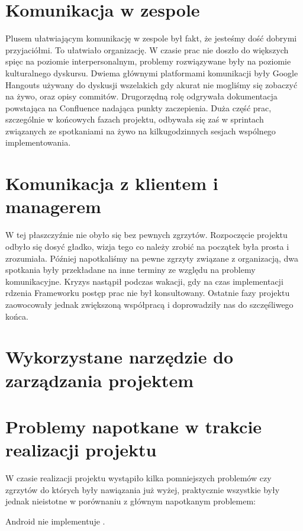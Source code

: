 \section{Komunikacja w zespole}
Plusem ułatwiającym komunikację w zespole był fakt, że jesteśmy dość dobrymi przyjaciółmi. To ułatwiało organizację. W czasie prac nie doszło do większych spięc na poziomie interpersonalnym, problemy rozwiązywane były na poziomie kulturalnego dyskursu. Dwiema głównymi platformami komunikacji były Google Hangouts używany do dyskusji wszelakich gdy akurat nie mogliśmy się zobaczyć na żywo, oraz opisy commitów. Drugorzędną rolę odgrywała dokumentacja powstająca na Confluence nadająca punkty zaczepienia. Duża część prac, szczególnie w końcowych fazach projektu, odbywała się zaś w sprintach związanych ze spotkaniami na żywo na kilkugodzinnych sesjach wspólnego implementowania.

\section{Komunikacja z klientem i managerem}
W tej płaszczyźnie nie obyło się bez pewnych zgrzytów. Rozpoczęcie projektu odbyło się dosyć gładko, wizja tego co należy zrobić na początek była prosta i zrozumiała. Później napotkaliśmy na pewne zgrzyty związane z organizacją, dwa spotkania były przekładane na inne terminy ze względu na problemy komunikacyjne. Kryzys nastąpił podczas wakacji, gdy na czas implementacji rdzenia Frameworku postęp prac nie był konsultowany. Ostatnie fazy projektu zaowocowały jednak zwiększoną współpracą i doprowadziły nas do szczęśliwego końca.

\section{Wykorzystane narzędzie do zarządzania projektem}

\section{Problemy napotkane w trakcie realizacji projektu}
\label{problem}

W czasie realizacji projektu wystąpiło kilka pomniejszych problemów czy zgrzytów do których były nawiązania już wyżej, praktycznie wszystkie były jednak nieistotne w porównaniu z głównym napotkanym problemem:

Android nie implementuje .

